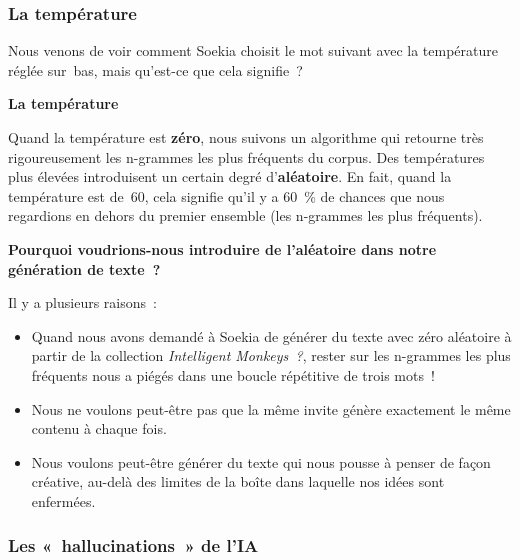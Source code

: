 \documentclass[12pt,a4paper]{article}
\begin{document}
\subsubsection{La température}

Nous venons de voir comment Soekia choisit le mot suivant avec la température réglée sur~bas, mais qu'est-ce que cela signifie~?

\begin{keypointbox}
  \textbf{La température}

  Quand la température est \textbf{zéro}, nous suivons un algorithme qui retourne très rigoureusement les n-grammes les plus fréquents du corpus. Des températures plus élevées introduisent un certain degré d'\textbf{aléatoire}. En fait, quand la température est de~60, cela signifie qu'il y a 60~\% de chances que nous regardions en dehors du premier ensemble (les n-grammes les plus fréquents).
\end{keypointbox}

\begin{keypointbox}
  \textbf{Pourquoi voudrions-nous introduire de l'aléatoire dans notre génération de texte~?}

  Il y a plusieurs raisons~:
  \begin{itemize}
    \item Quand nous avons demandé à Soekia de générer du texte avec zéro aléatoire à partir de la collection \emph{Intelligent Monkeys~?}, rester sur les n-grammes les plus fréquents nous a piégés dans une boucle répétitive de trois mots~!
    \item Nous ne voulons peut-être pas que la même invite génère exactement le même contenu à chaque fois.
    \item Nous voulons peut-être générer du texte qui nous pousse à penser de façon créative, au-delà des limites de la boîte dans laquelle nos idées sont enfermées.
  \end{itemize}
\end{keypointbox}

\subsubsection{Les «~hallucinations~» de l'IA}
\end{document}
